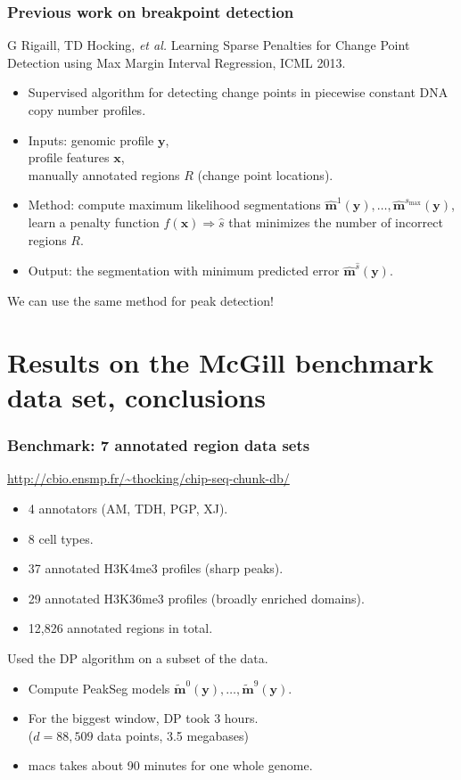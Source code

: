\documentclass{beamer}
\begin{document}
\begin{frame}
  \frametitle{Previous work on breakpoint detection}
  G Rigaill, TD Hocking, \emph{et al.} Learning Sparse Penalties for Change
  Point Detection using Max Margin Interval Regression, ICML 2013.
  \begin{itemize}
  \item Supervised algorithm for detecting change points in piecewise
    constant DNA copy number profiles.
  \item Inputs: genomic profile $\mathbf y$, \\
    profile features $\mathbf x$, \\
    manually annotated regions $R$ (change point locations).
  \item Method: compute maximum likelihood segmentations $\mathbf{\hat
      m}^1(\mathbf y), \dots, \mathbf{\hat m}^{s_{\text{max}}}(\mathbf
    y)$, learn a penalty function $f(\mathbf x) \Rightarrow \hat s$
    that minimizes the number of incorrect regions $R$.
    \item Output: the segmentation with minimum predicted error
      $\mathbf{\hat m}^{\hat s}(\mathbf y)$.
  \end{itemize}
  We can use the same method for peak detection!
\end{frame}

\section{Results on the McGill benchmark data set, conclusions}

\begin{frame}
  \frametitle{Benchmark: 7 annotated region data sets}
  \url{http://cbio.ensmp.fr/~thocking/chip-seq-chunk-db/}
  \begin{itemize}
  \item 4 annotators (AM, TDH, PGP, XJ).
  \item 8 cell types.
  \item 37 annotated H3K4me3 profiles (sharp peaks).
  \item 29 annotated H3K36me3 profiles (broadly enriched domains).
  \item 12,826 annotated regions in total.
  \end{itemize}
  Used the DP algorithm on a subset of the data.
  \begin{itemize}
  \item Compute PeakSeg models $\mathbf{\tilde m}^0(\mathbf y), \dots,
    \mathbf{\tilde m}^{9}(\mathbf y)$.
  \item For the biggest window, DP took 3 hours.\\
    ($d=88,509$ data points, 3.5  megabases)
  \item macs takes about 90 minutes for one whole genome.
  \end{itemize}
\end{frame}
\end{document}
